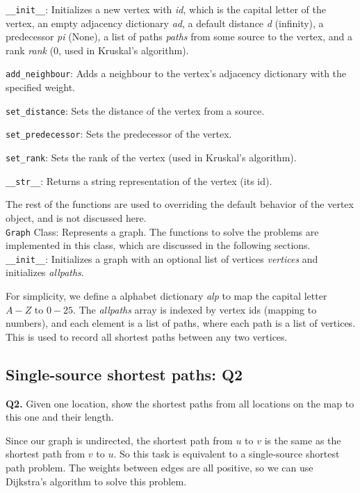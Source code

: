 \documentclass[UTF8]{ctexart}
\begin{document}
\texttt{\_\_init\_\_}: Initializes a new vertex with \textit{id}, which is the capital letter of the vertex,
an empty adjacency dictionary \textit{ad}, a default distance \textit{d} (infinity), a predecessor \textit{pi} (None),
a list of paths \textit{paths} from some source to the vertex, and a rank \textit{rank} (0, used in Kruskal's algorithm).

\texttt{add\_neighbour}: Adds a neighbour to the vertex's adjacency dictionary with the specified weight.

\texttt{set\_distance}: Sets the distance of the vertex from a source.

\texttt{set\_predecessor}: Sets the predecessor of the vertex.

\texttt{set\_rank}: Sets the rank of the vertex (used in Kruskal's algorithm).

\texttt{\_\_str\_\_}: Returns a string representation of the vertex (its id).

The rest of the functions are used to overriding the default behavior of the vertex object, and is not discussed here.\\

\texttt{Graph} Class: Represents a graph. The functions to solve the problems are implemented in this class, which are discussed in the following sections.\\
\texttt{\_\_init\_\_}: Initializes a graph with an optional list of vertices \textit{vertices} and initializes \textit{allpaths}.

For simplicity, we define a alphabet dictionary \textit{alp} to map the capital letter $A-Z$ to $0-25$.
The \textit{allpaths} array is indexed by vertex ids (mapping to numbers), and each element is a list of paths, where each path is a list of vertices.
This is used to record all shortest paths between any two vertices.

\subsection{Single-source shortest paths: Q2}
\textbf{Q2.} Given one location, show the shortest paths from all locations on the
map to this one and their length.

Since our graph is undirected, the shortest path from $u$ to $v$ is the same as the shortest path from $v$ to $u$.
So this task is equivalent to a single-source shortest path problem.
The weights between edges are all positive, so we can use Dijkstra's algorithm to solve this problem.
\end{document}
